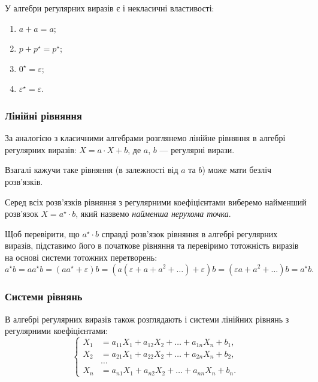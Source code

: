 У алгебри регулярних виразів є і некласичні властивості:
\begin{enumerate}
	\item $a + a = a$;
	\item $p + p^\star = p^\star$;
	\item $0^\star = \varepsilon$;
	\item $\varepsilon^\star = \varepsilon$.
\end{enumerate}

\subsubsection{Лінійні рівняння}

За аналогією з класичними алгебрами розглянемо лінійне рівняння в алгебрі регулярних виразів: $X = a \cdot X + b$, де $a$, $b$ --- регулярні вирази. \medskip

Взагалі кажучи таке рівняння (в залежності від $a$ та $b$) може мати безліч розв'язків. \medskip

Серед всіх розв'язків рівняння з регулярними коефіцієнтами виберемо найменший розв'язок $X = a^\star \cdot b$, який назвемо \textit{найменша нерухома точка}. \medskip

Щоб перевірити, що $a^\star \cdot b$ справді розв'язок рівняння в алгебрі регулярних виразів, підставимо його в початкове рівняння та перевіримо тотожність виразів на основі системи тотожних перетворень:
\[ a^\star b = a a^\star b = (a a^\star + \varepsilon) b = (a (\varepsilon + a + a^2 + \ldots ) + \varepsilon) b = (\varepsilon a + a^2 + \ldots) b = a^\star b. \]

\subsubsection{Системи рівнянь}

В алгебрі регулярних виразів також розглядають і системи лінійних рівнянь з регулярними коефіцієнтами:
\begin{equation}
	\left\{
		\begin{aligned}
			X_1 &= a_{11} X_1 + a_{12} X_2 + \ldots + a_{1n} X_n + b_1, \\
			X_2 &= a_{21} X_1 + a_{22} X_2 + \ldots + a_{2n} X_n + b_2, \\
			&\ldots \\
			X_n &= a_{n1} X_1 + a_{n2} X_2 + \ldots + a_{nn} X_n + b_n.
		\end{aligned}
	\right.
\end{equation}

